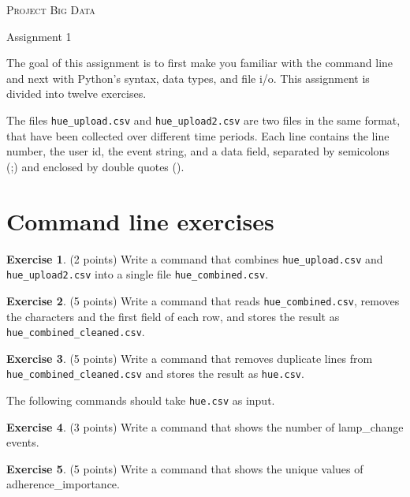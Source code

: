 \documentclass[11pt]{article}
\theoremstyle{definition}
\newtheorem{exercise}{Exercise}
\newcommand{\blankline}{\par\vspace{5mm}}
\begin{document}
	
\begin{center}
	\textsc{\Large Project Big Data}
	\blankline
	
	{\large Assignment 1}
\end{center}

\blankline \noindent The goal of this assignment is to first make you familiar with the command line and next with Python’s syntax, data types, and file i/o. This assignment is divided into twelve exercises.

The files \texttt{hue\_upload.csv} and \texttt{hue\_upload2.csv} are two files in the same format, that have been collected over different time periods. Each line contains the line number, the user id, the event string, and a data field, separated by semicolons (;) and enclosed by double quotes (\textquotedbl{}).

\section*{Command line exercises}
\label{command-line-exercises}

\begin{exercise}
	(2 points) Write a command that combines \texttt{hue\_upload.csv} and \texttt{hue\_upload2.csv} into a single file \texttt{hue\_combined.csv}.
\end{exercise}

\begin{exercise}
	(5 points) Write a command that reads \texttt{hue\_combined.csv}, removes the \textquotedbl{} characters and the first field of each row, and stores the result as \texttt{hue\_combined\_cleaned.csv}.
\end{exercise}

\begin{exercise}
	(5 points) Write a command that removes duplicate lines from \texttt{hue\_combined\_cleaned.csv} and stores the result as \texttt{hue.csv}.
\end{exercise}

\noindent The following commands should take \texttt{hue.csv} as input.

\begin{exercise}
	(3 points) Write a command that shows the number of lamp\_change events.
\end{exercise}

\begin{exercise}
	(5 points) Write a command that shows the unique values of adherence\_importance.
\end{exercise}
\end{document}
